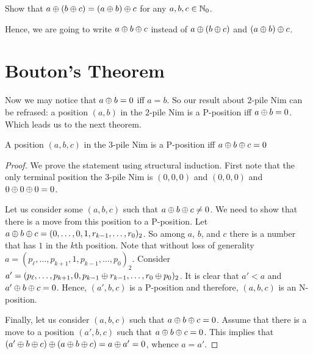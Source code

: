 \begin{exercise}
  Show that $a \oplus (b \oplus c) = (a \oplus b) \oplus c$
  for any $a, b, c \in \mathbb{N}_0$.
\end{exercise}
Hence, we are going to write $a \oplus b \oplus c$ instead of
$a \oplus (b \oplus c)$ and $(a \oplus b) \oplus c$.

\section{Bouton's Theorem}

Now we may notice that $a \oplus b = 0$ iff $a = b$. So
our result about $2$-pile Nim can be refrased:
a position $(a, b)$ in the $2$-pile Nim is a P-position iff
$a \oplus b = 0$. Which leads us to the next theorem.
\begin{theorem}
\label{theorem:bouton}
  A position $(a, b, c)$ in the $3$-pile Nim is a P-position iff
  $a \oplus b \oplus c = 0$
\end{theorem}
\begin{proof}
  We prove the statement using structural induction.
  First note that the only terminal position the $3$-pile Nim is $(0, 0, 0)$
  and $(0, 0, 0)$ and $0 \oplus 0 \oplus 0 = 0$.

  Let us consider
  some $(a, b, c)$ such that $a \oplus b \oplus c \neq 0$.
  We need to show that there is a move from this position to a P-position.
  Let $a \oplus b \oplus c =
      (0, \dots, 0, 1, r_{k - 1}, \dots, r_0)_2$. So among $a$, $b$, and $c$
  there is a number that has $1$ in the $k$th position.
  Note that without loss of generality
  $a = (p_\ell, \dots, p_{k + 1}, 1, p_{k - 1}, \dots, p_0)_2$.
  Consider $a' = (p_\ell, \dots, p_{k + 1}, 0,
    p_{k - 1} \oplus r_{k - 1}, \dots, r_0 \oplus p_0)_2$. It is clear that
  $a' < a$ and $a' \oplus b \oplus c = 0$.
  Hence, $(a', b, c)$ is a P-position and therefore, $(a, b, c)$ is an
  N-position.

  Finally, let us consider $(a, b, c)$ such that
  $a \oplus b \oplus c = 0$. Assume that there is a move to a
  position $(a', b, c)$ such that $a \oplus b \oplus c = 0$.
  This implies that
  $(a' \oplus b \oplus c) \oplus
      (a \oplus b \oplus c) =  a \oplus a' = 0$, whence $a = a'$.
\end{proof}
